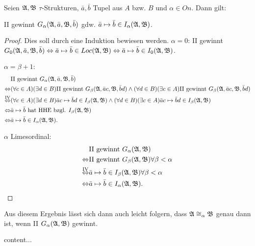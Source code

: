 \begin{lemma}
	Seien $\mathfrak{A},\mathfrak{B}$ $\tau$-Strukturen, $\bar{a},\bar{b}$ Tupel aus $A$ bzw. $B$ und $\alpha\in On$. Dann gilt:
	
	II gewinnt $G_\alpha(\mathfrak{A},\bar{a},\mathfrak{B},\bar{b})$ gdw. $\bar{a}\mapsto\bar{b}\in I_\alpha(\mathfrak{A},\mathfrak{B})$.
\end{lemma}
\begin{proof}
	Dies soll durch eine Induktion bewiesen werden.
	$\alpha=0$: II gewinnt $G_0(\mathfrak{A},\bar{a},\mathfrak{B},\bar{b}) \Leftrightarrow \bar{a}\mapsto\bar{b}\in Loc(\mathfrak{A},\mathfrak{B}) \Leftrightarrow \bar{a}\mapsto\bar{b}\in I_0(\mathfrak{A},\mathfrak{B})$.
	
	$\alpha=\beta+1$:
	\begin{align*}
		&\text{II gewinnt } G_\alpha(\mathfrak{A},\bar{a},\mathfrak{B},\bar{b}) \\
		\Leftrightarrow & (\forall c \in A)(\exists d\in B) \text{II gewinnt } G_\beta(\mathfrak{A},\bar{a}c,\mathfrak{B},\bar{b}d) \land (\forall d \in B)(\exists c\in A) \text{II gewinnt } G_\beta(\mathfrak{A},\bar{a}c,\mathfrak{B},\bar{b}d) \\
		\overset{\text{IV}}{\Leftrightarrow} & (\forall c \in A)(\exists d\in B) \bar{a}c\mapsto\bar{b}d\in I_\beta(\mathfrak{A},\mathfrak{B}) \land (\forall d \in B)(\exists c\in A) \bar{a}c\mapsto\bar{b}d\in I_\beta(\mathfrak{A},\mathfrak{B}) \\
		\Leftrightarrow& \bar{a}\mapsto\bar{b} \text{ hat HHE bzgl. } I_\beta(\mathfrak{A},\mathfrak{B}) \\
		\Leftrightarrow& \bar{a}\mapsto \bar{b}\in I_\alpha(\mathfrak{A},\mathfrak{B}).
	\end{align*}
	
	$\alpha$ Limesordinal:
	\begin{align*}
		&\text{II gewinnt } G_\alpha(\mathfrak{A},\mathfrak{B}) \\
		\Leftrightarrow & \text{II gewinnt } G_\beta(\mathfrak{A},\mathfrak{B}) \forall \beta <\alpha \\
		\overset{\text{IV}}{\Leftrightarrow}& \bar{a}\mapsto\bar{b} \in I_\beta(\mathfrak{A},\mathfrak{B}) \forall \beta<\alpha \\
		\Leftrightarrow & \bar{a}\mapsto\bar{b}\in I_\alpha(\mathfrak{A},\mathfrak{B}).
	\end{align*}
\end{proof}

Aus diesem Ergebnis lässt sich dann auch leicht folgern, dass $\mathfrak{A}\cong_\alpha\mathfrak{B}$ genau dann ist, wenn II $G_\alpha(\mathfrak{A},\mathfrak{B})$ gewinnt.

\begin{satz}
	content...
\end{satz}


















